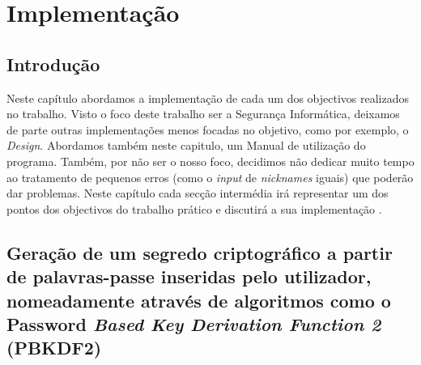\chapter{Implementação}
\label{chap:imp-test}

\section{Introdução}
\label{chap4:sec:intro}

Neste capítulo abordamos a implementação de cada um dos objectivos realizados no trabalho. Visto o foco deste trabalho ser a Segurança Informática, deixamos de parte outras implementações menos focadas no objetivo, como por exemplo, o \textit{Design}. \newline Abordamos também neste capitulo, um Manual de utilização do programa. \newline Também, por não ser o nosso foco, decidimos não dedicar muito tempo ao tratamento de pequenos erros (como o \textit{input} de \textit{nicknames} iguais) que poderão dar problemas.
\newline Neste capítulo cada secção intermédia irá representar um dos pontos dos objectivos do trabalho prático e discutirá a sua implementação .

\newline\section{Geração de um segredo criptográfico a partir de palavras-passe inseridas pelo utilizador, nomeadamente através de algoritmos como o Password \textit{Based Key Derivation Function 2} (PBKDF2)}
\label{chap4:sec:pbkdf}

